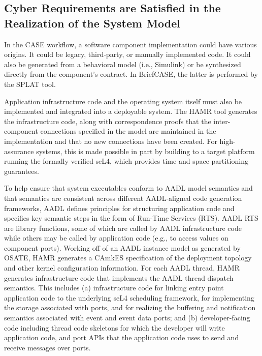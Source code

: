 \subsection{Cyber Requirements are Satisfied in the Realization of the System Model}

In the CASE workflow, a software component implementation could have various origins.  It could be legacy, third-party, or manually implemented code. It could also be generated from a behavioral model (i.e., Simulink) or be synthesized directly from the component's contract.  In BriefCASE, the latter is performed by the SPLAT tool.

Application infrastructure code and the operating system itself must also be implemented and integrated into a deployable system.  The HAMR tool generates the infrastructure code, along with correspondence proofs that the inter-component connections specified in the model are maintained in the implementation and that no new connections have been created.  For high-assurance systems, this is made possible in part by building to a target platform running the formally verified seL4, which provides time and space partitioning guarantees.

To help ensure that system executables conform to AADL model semantics and that semantics are consistent across different AADL-aligned code generation frameworks, AADL defines principles for structuring application code and specifies key semantic steps in the form of Run-Time Services (RTS). AADL RTS are library functions, some of which are called by AADL infrastructure code while others may be called by application code (e.g., to access values on component ports). 
%
Working off of an AADL instance model as generated by OSATE, HAMR generates a CAmkES specification of the deployment topology and other kernel configuration information. For each AADL thread, HAMR generates infrastructure code that implements the AADL thread dispatch semantics. This includes 
(a) infrastructure code for linking entry point application code to the underlying seL4 scheduling framework, for implementing the storage associated with ports, and for realizing the buffering and notification semantics associated with event and event data ports; and 
(b) developer-facing code including thread code skeletons for which the developer will write application code, and port APIs that the application code uses to send and receive messages over ports.

